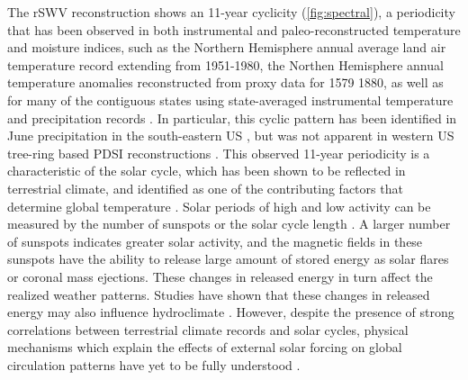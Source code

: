 



The rSWV reconstruction shows an 11-year cyclicity
(\ref{fig:spectral}), a periodicity that has been observed in both
instrumental and paleo-reconstructed temperature and moisture indices,
such as the Northern Hemisphere annual average land air temperature
record extending from 1951-1980, the Northen Hemisphere annual temperature
anomalies reconstructed from proxy data for 1579 1880, as well as for many
of the contiguous states using state-averaged instrumental temperature and
precipitation records \cite{hancock1979cross, lassen1995variability}. In
particular, this cyclic pattern has been identified in June precipitation
in the south-eastern US \cite{hancock1979cross}, but was not apparent in
western US tree-ring based PDSI reconstructions \cite{cook1997new}. This
observed 11-year periodicity is a characteristic of the solar cycle, which
has been shown to be reflected in terrestrial climate, and identified
as one of the contributing factors that determine global temperature
\cite{reid2002solar, national1994Solar, lassen1995variability}. Solar
periods of high and low activity can be measured by the number of sunspots
or the solar cycle length \cite{friis1991length, usoskin2003millennium}. A
larger number of sunspots indicates greater solar activity, and the
magnetic fields in these sunspots have the ability to release large amount
of stored energy as solar flares or coronal mass ejections. These changes
in released energy in turn affect the realized weather patterns.  Studies
have shown that these changes in released energy may also influence
hydroclimate \cite{nichols2012hydroclimate, hancock1979cross}. However,
despite the presence of strong correlations between terrestrial climate
records and solar cycles, physical mechanisms which explain the effects
of external solar forcing on global circulation patterns have yet to be
fully understood \cite{franks2002assessing}.

